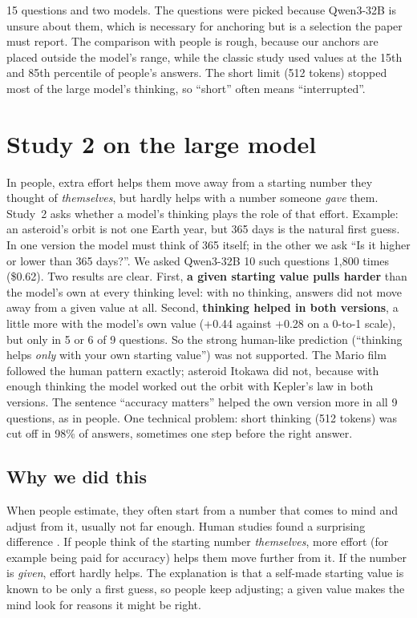 \documentclass[11pt,a4paper]{article}
\begin{document}
\begin{cautionbox}[Limits.]
15 questions and two models. The questions were picked because Qwen3-32B is unsure about them, which is necessary for anchoring but is a selection the paper must report. The comparison with people is rough, because our anchors are placed outside the model's range, while the classic study used values at the 15th and 85th percentile of people's answers. The short limit (512 tokens) stopped most of the large model's thinking, so \enquote{short} often means \enquote{interrupted}.
\end{cautionbox}

\section{Study 2 on the large model}
\label{sec:e5}

\begin{inshort}
In people, extra effort helps them move away from a starting number they thought of \emph{themselves}, but hardly helps with a number someone \emph{gave} them. Study~2 asks whether a model's thinking plays the role of that effort. Example: an asteroid's orbit is not one Earth year, but 365 days is the natural first guess. In one version the model must think of 365 itself; in the other we ask \enquote{Is it higher or lower than 365 days?}. We asked Qwen3-32B 10 such questions 1,800 times (\$0.62). Two results are clear. First, \textbf{a given starting value pulls harder} than the model's own at every thinking level: with no thinking, answers did not move away from a given value at all. Second, \textbf{thinking helped in both versions}, a little more with the model's own value (+0.44 against +0.28 on a 0-to-1 scale), but only in 5 or 6 of 9 questions. So the strong human-like prediction (\enquote{thinking helps \emph{only} with your own starting value}) was not supported. The Mario film followed the human pattern exactly; asteroid Itokawa did not, because with enough thinking the model worked out the orbit with Kepler's law in both versions. The sentence \enquote{accuracy matters} helped the own version more in all 9 questions, as in people. One technical problem: short thinking (512 tokens) was cut off in 98\% of answers, sometimes one step before the right answer.
\end{inshort}

\subsection{Why we did this}
When people estimate, they often start from a number that comes to mind and adjust from it, usually not far enough. Human studies found a surprising difference \citep{epley2001putting,epley2005effortful}. If people think of the starting number \emph{themselves}, more effort (for example being paid for accuracy) helps them move further from it. If the number is \emph{given}, effort hardly helps. The explanation is that a self-made starting value is known to be only a first guess, so people keep adjusting; a given value makes the mind look for reasons it might be right.
\end{document}
